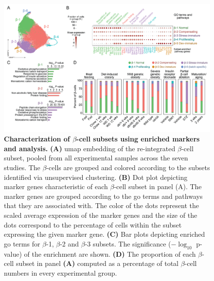 \begin{figure}[H]
\centering
\includegraphics[width=\linewidth]{Chapter5/Fig/F3-1-v2-03.png}
\caption[Characterization of $\beta$-cell subsets using enriched markers and  analysis]{\textbf{Characterization of $\beta$-cell subsets using enriched markers and  analysis.} \textbf{(A)} \gls{umap} embedding of the re-integrated $\beta$-cell subset, pooled from all experimental samples across the seven studies. The $\beta$-cells are grouped and colored according to the subsets identified via unsupervised clustering. \textbf{(B)} Dot plot depicting marker genes characteristic of each $\beta$-cell subset in panel (A). The marker genes are grouped according to the \gls{go} terms and pathways that they are associated with. The color of the dots represent the scaled average expression of the marker genes and the size of the dots correspond to the percentage of cells within the subset expressing the given marker gene. \textbf{(C)} Bar plots depicting enriched \gls{go} terms for $\beta$-1, $\beta$-2 and $\beta$-3 subsets. The significance ($-\log_{10}$ p-value) of the enrichment are shown. \textbf{(D)} The proportion of each $\beta$-cell subset in panel \textbf{(A)} computed as a percentage of total $\beta$-cell numbers in every experimental group.}
\label{fig:chp3_betasubsets}
\end{figure}

